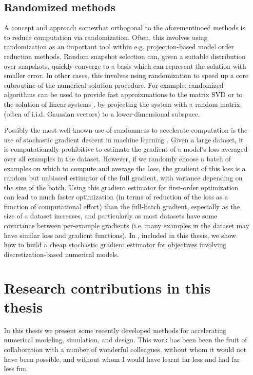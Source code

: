 \documentclass{puthesis}
\begin{document}
\subsection{Randomized methods}
A concept and approach somewhat orthogonal to the aforementinoed methods
is to reduce computation via randomization.
Often, this involves using randomization as an important tool within e.g.
projection-based model order reduction methods.
Random snapshot selection can, given a suitable distribution over snapshots, quickly
converge to a basis which can represent the solution with smaller error.
In other cases, this involves using randomization to speed up a core subroutine of
the numerical solution procedure.
For example, randomized algorithms can be used to provide fast approixmations to the
matrix SVD or to the solution of linear systems
\citep{drineas2006fast,drineas2016randnla}, by projecting the system with a
random matrix (often of i.i.d. Gaussian vectors) to a lower-dimensional subspace.

Possibly the most well-known use of randomness to accelerate computation is the use
of stochastic gradient descent in machine learning
\citep{robbins1951stochastic,bottou2010large}.
Given a large dataset, it is computationally prohibitive to estimate the gradient of a
model's loss averaged over all examples in the dataset.
However, if we randomly choose a batch of examples on which to compute and average
the loss, the gradient of this loss is a random but unbiased estimator of the full
gradient, with variance depending on the size of the batch.
Using this gradient estimator for first-order optimization can lead to much faster
optimization (in terms of reduction of the loss as a function of computational effort)
than the full-batch gradient, especially as the size of a dataset increases, and
particularly as most datasets have some covariance between per-example gradients
(i.e. many examples in the dataset may have similar loss and gradient functions).
In \citep{beatson2019efficient}, included in this thesis, we show how to
build a cheap stochastic gradient estimator for objectives involving
discretization-based numerical models.

\section{Research contributions in this thesis}

In this thesis we present some recently developed methods for accelerating
numerical modeling, simulation, and design.
This work has been been the fruit of collaboration with a number of wonderful
colleagues, without whom it would not have been possible, and without whom
I would have learnt far less and had far less fun.
\end{document}
